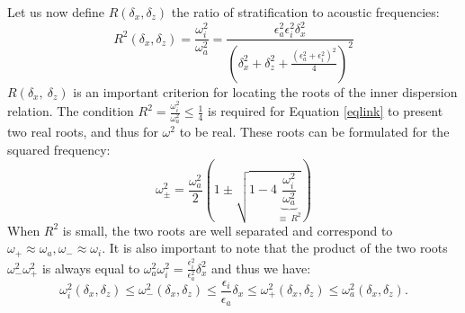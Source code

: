 \documentclass[a4paper,11pt]{article}
\begin{document}
Let us now define $R(\delta_x,\delta_z)$ the ratio of stratification to acoustic frequencies:
%
\begin{equation}
R^2(\delta_x,\delta_z)=
\frac{\omega_i^2}{\omega_a^2}=
\frac{\epsilon_a^2\epsilon_i^2\delta_x^2}
{\left(\delta_x^2+\delta_z^2
	+\frac{(\epsilon_a^2+\epsilon_i^2)^2}{4}
	\right)^2}
\label{eqratio}
\end{equation}
%
$R(\delta_x,\ \delta_z)$ is an important criterion for locating the roots of the inner dispersion relation.
The condition $\displaystyle R^2=\frac{\omega_i^2}{\omega_a^2}\le \frac{1}{4}$ is required for Equation \ref{eqlink} to present two real roots, and thus for $\omega^2$ to be real. These roots can be formulated for the squared frequency:
%
\begin{equation}
	\omega_{\pm}^2
	=\frac{\omega_a^2}{2}
	\left(
	1\pm
	\sqrt{1-4\underbrace{\frac{\omega_i^2}{\omega_a^2}}_{\equiv\ R^2}}
	\right)
\label{solseq}
\end{equation}
%
When $R^2$ is small, the two roots are well separated and correspond to $\omega_+\approx \omega_a, \omega_-\approx \omega_i$. It is also important to note that the product of the two roots $\omega_-^2 \omega_+^2$ is always equal to $\displaystyle \omega_a^2\omega_i^2=\frac{\epsilon_i^2}{\epsilon_a^2}\delta_x^2$ and thus we have:
%
\begin{equation}
\omega_i^2(\delta_x, \delta_z)\le \omega_-^2(\delta_x, \delta_z) \le \frac{\epsilon_i}{\epsilon_a}\delta_x \le \omega_+^2(\delta_x, \delta_z) \le \omega_a^2(\delta_x, \delta_z).
\label{boundedomega2}
\end{equation}
%
\end{document}
